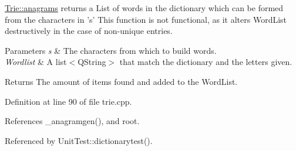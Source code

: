 \hyperlink{class_trie_aa42c01330538b67e0aff76068f02a8f7}{Trie\-::anagrams} returns a List of words in the dictionary which can be formed from the characters in 's' This function is not functional, as it alters Word\-List destructively in the case of non-\/unique entries. 


\begin{DoxyParams}{Parameters}
{\em s} & The characters from which to build words. \\
\hline
{\em Wordlist} & A list$<$\-Q\-String$>$ that match the dictionary and the letters given. \\
\hline
\end{DoxyParams}
\begin{DoxyReturn}{Returns}
The amount of items found and added to the Word\-List. 
\end{DoxyReturn}


Definition at line 90 of file trie.\-cpp.



References \-\_\-anagramgen(), and root.



Referenced by Unit\-Test\-::dictionarytest().


